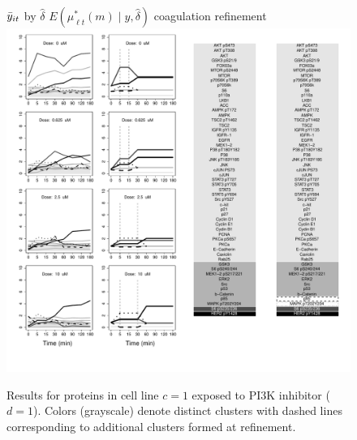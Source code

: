 \begin{figure}[tbp]
\phantom{xx} 
\hskip 2cm $\bar{y}_{it}$ by $\hat{\delta}$  \hspace{0.8cm} $E(\mu^*_{\ell t}(m)\mid y, \hat{\delta})$
  \hspace{0.9cm} coagulation \hspace{0.9cm} refinement\\
\includegraphics[scale=0.4]{figs_biometrics/results_cc_1_d_1_gray.pdf}\\[-.2cm]
\caption{Results for proteins in cell line $c=1$ exposed to PI3K inhibitor ($d=1$). Colors (grayscale) denote distinct clusters with dashed lines corresponding to additional clusters formed at refinement.
}
\end{figure}
